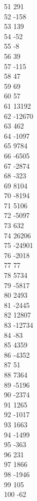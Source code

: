 { 51	291 \\
 52	-158 \\
 53	139 \\
 54	-52 \\
 55	-8 \\
 56	39 \\
 57	-115 \\
 58	47 \\
 59	69 \\
 60	57 \\
 61	13192 \\
 62	-12670 \\
 63	462 \\
 64	-1097 \\
 65	9784 \\
 66	-6505 \\
 67	-2874 \\
 68	-323 \\
 69	8104 \\
 70	-8194 \\
 71	5106 \\
 72	-5097 \\
 73	632 \\
 74	26206 \\
 75	-24901 \\
 76	-2018 \\
 77	77 \\
 78	5734 \\
 79	-5817 \\
 80	2493 \\
 81	-2445 \\
 82	12807 \\
 83	-12734 \\
 84	-83 \\
 85	4359 \\
 86	-4352 \\
 87	51 \\
 88	7364 \\
 89	-5196 \\
 90	-2374 \\
 91	1265 \\
 92	-1017 \\
 93	1663 \\
 94	-1499 \\
 95	-363 \\
 96	231 \\
 97	1866 \\
 98	-1946 \\
 99	105 \\
 100	-62 \\
}
